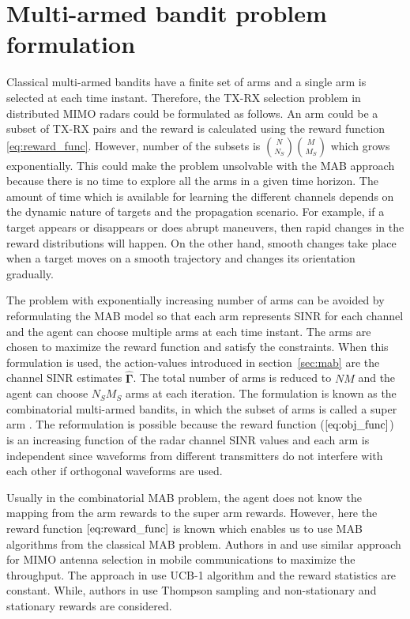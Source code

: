 \documentclass[conference]{IEEEtran}
\newcommand{\vsinrb}{\widehat{\boldsymbol{\Gamma}}}
\begin{document}
\section{Multi-armed bandit problem formulation}
\label{sec:fmab}

Classical multi-armed bandits have a finite set of arms and a single arm is selected at each time instant.
Therefore, the TX-RX selection problem in distributed MIMO radars could be formulated as follows.
An arm could be a subset of TX-RX pairs and the reward is calculated using the reward function \eqref{eq:reward_func}.
However, number of the subsets is $\binom{N}{N_S}\binom{M}{M_S}$ which grows exponentially. This could make the problem unsolvable with the MAB approach because there is no time to explore all the arms in a given time horizon.
The amount of time which is available for learning the different channels depends on the dynamic nature of targets and the propagation scenario.
For example, if a target appears or disappears or does abrupt maneuvers, then rapid changes in the reward distributions will happen. 
On the other hand, smooth changes take place when a target moves on a smooth trajectory and changes its orientation gradually.

The problem with exponentially increasing number of arms can be avoided by reformulating the MAB model so that each arm represents SINR for each channel and the agent can choose multiple arms at each time instant.
The arms are chosen to maximize the reward function and satisfy the constraints.
When this formulation is used, the action-values introduced in section~\ref{sec:mab} are the channel SINR estimates $\vsinrb$.
The total number of arms is reduced to $NM$ and the agent can choose $N_S M_S$ arms at each iteration.
The formulation is known as the combinatorial multi-armed bandits, in which the subset of arms is called a super arm \cite{Chen2014}.
The reformulation is possible because the reward function ($\ref{eq:obj_func}$) is an increasing function of the radar channel SINR values and each arm is independent since waveforms from different transmitters do not interfere with each other if orthogonal waveforms are used.

Usually in the combinatorial MAB problem, the agent does not know the mapping from the arm rewards to the super arm rewards.
However, here the reward function $\eqref{eq:reward_func}$ is known which enables us to use MAB algorithms from the classical MAB problem.
Authors in \cite{Mukherjee2012} and \cite{Kuai2019} use similar approach for MIMO antenna selection in mobile communications to maximize the throughput.
The approach in \cite{Mukherjee2012} use UCB-1 algorithm and the reward statistics are constant.
While, authors in \cite{Kuai2019} use Thompson sampling and non-stationary and stationary rewards are considered.
\end{document}
